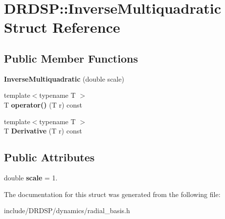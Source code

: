 \hypertarget{struct_d_r_d_s_p_1_1_inverse_multiquadratic}{\section{D\-R\-D\-S\-P\-:\-:Inverse\-Multiquadratic Struct Reference}
\label{struct_d_r_d_s_p_1_1_inverse_multiquadratic}
}
\subsection*{Public Member Functions}
\begin{DoxyCompactItemize}
\item 
\hypertarget{struct_d_r_d_s_p_1_1_inverse_multiquadratic_a9de4a748cfda8c1bd8c0dfca408faed7}{{\bfseries Inverse\-Multiquadratic} (double scale)}\label{struct_d_r_d_s_p_1_1_inverse_multiquadratic_a9de4a748cfda8c1bd8c0dfca408faed7}

\item 
\hypertarget{struct_d_r_d_s_p_1_1_inverse_multiquadratic_a5ced1f6abf959202569facafb56be592}{{\footnotesize template$<$typename T $>$ }\\T {\bfseries operator()} (T r) const }\label{struct_d_r_d_s_p_1_1_inverse_multiquadratic_a5ced1f6abf959202569facafb56be592}

\item 
\hypertarget{struct_d_r_d_s_p_1_1_inverse_multiquadratic_abf5407eb574dbac34ad1cbd07f59be50}{{\footnotesize template$<$typename T $>$ }\\T {\bfseries Derivative} (T r) const }\label{struct_d_r_d_s_p_1_1_inverse_multiquadratic_abf5407eb574dbac34ad1cbd07f59be50}

\end{DoxyCompactItemize}
\subsection*{Public Attributes}
\begin{DoxyCompactItemize}
\item 
\hypertarget{struct_d_r_d_s_p_1_1_inverse_multiquadratic_a39009875f833958785889ac9373ad37c}{double {\bfseries scale} = 1.}\label{struct_d_r_d_s_p_1_1_inverse_multiquadratic_a39009875f833958785889ac9373ad37c}

\end{DoxyCompactItemize}


The documentation for this struct was generated from the following file\-:\begin{DoxyCompactItemize}
\item 
include/\-D\-R\-D\-S\-P/dynamics/radial\-\_\-basis.\-h\end{DoxyCompactItemize}
